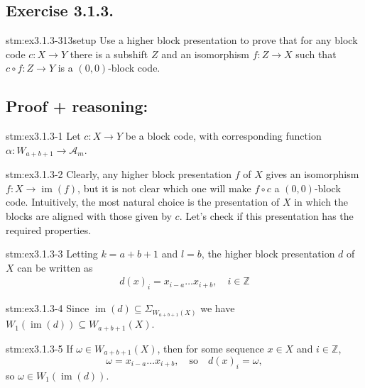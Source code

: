 \subsection*{Exercise 3.1.3.}

\begin{exercise}{stm:ex3.1.3-313setup}
Use a higher block presentation to prove that for any block code $c: X \to Y$ there is a subshift $Z$ and an isomorphism $f: Z \to X$ such that $c \circ f: Z \to Y$ is a $(0,0)$-block code.
\end{exercise}

\subsection*{Proof {\color{blue}+ reasoning}:}

\begin{statement}{stm:ex3.1.3-1}
Let $c: X \to Y$ be a block code, with corresponding function $\alpha: W_{a+b+1} \to \mathcal{A}_m$.
\end{statement}

\begin{explanation}{stm:ex3.1.3-2}
Clearly, any higher block presentation $f$ of $X$ gives an isomorphism $f: X \to \operatorname{im}(f)$, but it is not clear which one will make $f \circ c$ a $(0,0)$-block code. Intuitively, the most natural choice is the presentation of $X$ in which the blocks are aligned with those given by $c$. Let's check if this presentation has the required properties.
\end{explanation}

\begin{statement}{stm:ex3.1.3-3}
Letting $k = a + b + 1$ and $l = b$, the higher block presentation $d$ of $X$ can be written as
\begin{align*}
d(x)_i = x_{i-a} \ldots x_{i+b}, \quad i \in \mathbb{Z}
\end{align*}
\end{statement}

\begin{statement}{stm:ex3.1.3-4}
Since $\operatorname{im}(d) \subseteq \Sigma_{W_{a+b+1}(X)}$ we have $W_1(\operatorname{im}(d)) \subseteq W_{{a+b+1}}(X)$.
\end{statement}

\begin{statement}{stm:ex3.1.3-5}
If $\omega \in W_{a+b+1}(X)$, then for some sequence $x \in X$ and $i \in \mathbb{Z}$,
\[
\omega = x_{i-a} \ldots x_{i+b}, \quad \text{so} \quad d(x)_i = \omega,
\]
so $\omega \in W_1(\operatorname{im}(d))$.
\end{statement}

